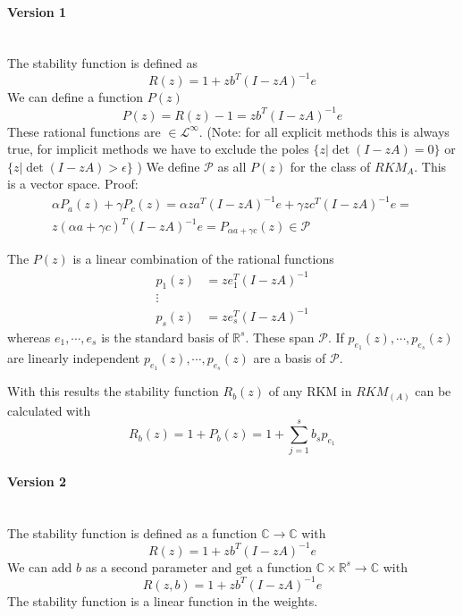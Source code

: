 \documentclass[a4paper]{article}
\numberwithin{equation}{section}
\theoremstyle{plain}
\theoremstyle{definition}
\numberwithin{theorem}{section}
\newcommand{\R}{\mathbb{R}}
\newcommand{\CN}{\mathbb{C}}
\newcommand{\1}{\mathbbm{1}}
\begin{document}
\paragraph*{Version 1} $ $\\

The stability function is defined as 
\begin{equation}\label{eq:stab_func}
R(z) = 1 + zb^T(I - zA)^{-1}e
\end{equation}
We can define a function $P(z)$
\begin{equation}
P(z) = R(z)-1 = z b^T (I - zA)^{-1} e
\end{equation}
These rational functions are $\in \mathcal{L}^\infty$. (Note: for all explicit methods this is always true, for implicit methods we have to exclude the poles $\{z | \det(I - zA) = 0\}$ or  $\{z | \det(I - zA) > \epsilon \}$ )
We define $\mathcal{P}$ as all $P(z)$ for the class of $RKM_A$. 
This is a vector space.
Proof:
\begin{multline}
\alpha P_a(z) + \gamma P_c(z) =  \alpha z a^T (I - zA)^{-1} e + \gamma z c^T (I - zA)^{-1} e=\\
z (\alpha a+ \gamma c)^T (I - zA)^{-1} e= P_{\alpha a + \gamma c}(z) \in \mathcal{P}
\end{multline}

The $P(z)$ is a linear combination of the rational functions
\begin{subequations}
\begin{align}
p_1(z) &= z e_1^T (I - zA)^{-1}\\
\vdots \\
p_s(z) &= z e_s^T (I - zA)^{-1}
\end{align}
\end{subequations}
whereas $e_1,\cdots,e_s$ is the standard basis of $\R^s$.
These span $\mathcal{P}$. If $p_{e_1}(z),\cdots,p_{e_s}(z)$ are linearly independent $p_{e_1}(z),\cdots,p_{e_s}(z)$ are a basis of $\mathcal{P}$.

With this results the stability function $R_b(z)$ of any RKM in $RKM_{(A)}$ can be calculated with 
\begin{equation}
R_b(z) = 1 + P_b(z) = 1 + \sum_{j = 1}^s b_s p_{e_1}
\end{equation}




\paragraph*{Version 2} $ $\\
The stability function is defined as a function $\CN \to \CN$ with 
\begin{equation}\label{eq:stab_func}
R(z) = 1 + zb^T(I - zA)^{-1}e
\end{equation}
We can add $b$ as a second parameter and get a function $\CN \times \R^s \to \CN$ with
\begin{equation}\label{eq:stab_func}
R(z,b) = 1 + zb^T(I - zA)^{-1}e
\end{equation}
The stability function is a linear function in the weights.
\end{document}
